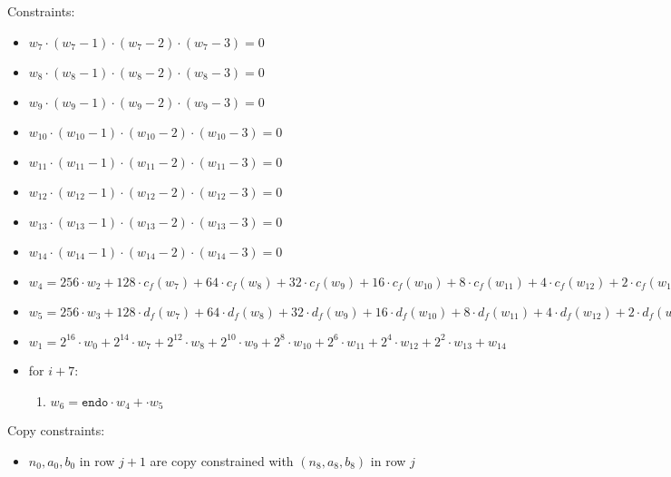 Constraints:
\begin{itemize}
    \item $w_{7} \cdot (w_{7} - 1) \cdot (w_{7} - 2)\cdot (w_{7} - 3)  = 0$
    \item $w_{8} \cdot (w_{8} - 1) \cdot (w_{8} - 2)\cdot (w_{8} - 3)  = 0$
    \item $w_{9} \cdot (w_{9} - 1) \cdot (w_{9} - 2)\cdot (w_{9} - 3)  = 0$
    \item $w_{10} \cdot (w_{10} - 1) \cdot (w_{10} - 2)\cdot (w_{10} - 3)  = 0$
    \item $w_{11} \cdot (w_{11} - 1) \cdot (w_{11} - 2)\cdot (w_{11} - 3)  = 0$
    \item $w_{12} \cdot (w_{12} - 1) \cdot (w_{12} - 2)\cdot (w_{12} - 3)  = 0$
    \item $w_{13} \cdot (w_{13} - 1) \cdot (w_{13} - 2)\cdot (w_{13} - 3)  = 0$
    \item $w_{14} \cdot (w_{14} - 1) \cdot (w_{14} - 2)\cdot (w_{14} - 3)  = 0$
    \item $w_{4} = 256 \cdot w_{2} + 128 \cdot c_f(w_7) + 64 \cdot c_f(w_8) + 32 \cdot c_f(w_9) + 16 \cdot c_f(w_{10}) + 8 \cdot c_f(w_{11}) + 4 \cdot c_f(w_{12}) + 2 \cdot c_f(w_{13}) + c_f(w_{14})$
    \item $w_{5} = 256 \cdot w_{3} + 128 \cdot d_f(w_7) + 64 \cdot d_f(w_8) + 32 \cdot d_f(w_9) + 16 \cdot d_f(w_{10}) + 8 \cdot d_f(w_{11}) + 4 \cdot d_f(w_{12}) + 2 \cdot d_f(w_{13}) + d_f(w_{14})$
    \item $w_{1} = 2^{16} \cdot w_{0} + 2^{14} \cdot w_7 + 2^{12} \cdot w_8 + 2^{10} \cdot w_9 + 2^8 \cdot w_{10} + 2^6 \cdot w_{11} + 2^4 \cdot w_{12} + 2^2 \cdot w_{13} + w_{14}$
	\item for $i + 7$:
	\begin{enumerate}
		\item $w_{6} = \texttt{endo} \cdot w_{4} +  \cdot w_{5}$
	\end{enumerate}
\end{itemize}

    Copy constraints:
    \begin{itemize}
    \item $n_0, a_0, b_0$ in row $j + 1$ are copy constrained with $(n_8, a_8, b_8)$ in row $j$ 
    \end{itemize}